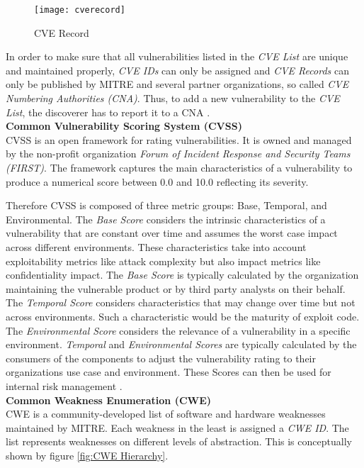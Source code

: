 \begin{figure}[H]
	\centering
	\texttt{[image: cverecord]}
	\caption[CVE Record]{CVE Record }
	\label{fig:CVE Record}
\end{figure}

In order to make sure that all vulnerabilities listed in the \textit{CVE List} are unique and maintained properly, \textit{CVE IDs} can only be assigned and \textit{CVE Records} can only be published by MITRE and several partner organizations, so called \textit{CVE Numbering Authorities (CNA)}. Thus, to add a new vulnerability to the \textit{CVE List}, the discoverer has to report it to a CNA \cite{CVEWebsite}.\\

\noindent
\textbf{Common Vulnerability Scoring System (CVSS)}\\
\noindent
CVSS is an open framework for rating vulnerabilities. It is owned and managed by the non-profit organization \textit{Forum of Incident Response and Security Teams (FIRST)}. The framework captures the main characteristics of a vulnerability to produce a numerical score between 0.0 and 10.0 reflecting its severity.\par
Therefore CVSS is composed of three metric groups: Base, Temporal, and Environmental. The \textit{Base Score} considers the intrinsic characteristics of a vulnerability that are constant over time and assumes the worst case impact across different environments. These characteristics take into account exploitability metrics like attack complexity but also impact metrics like confidentiality impact. The \textit{Base Score} is typically calculated by the organization maintaining the vulnerable product or by third party analysts on their behalf. The \textit{Temporal Score} considers characteristics that may change over time but not across environments. Such a characteristic would be the maturity of exploit code. The \textit{Environmental Score} considers the relevance of a vulnerability in a specific environment. \textit{Temporal} and \textit{Environmental Scores} are typically calculated by the consumers of the components to adjust the vulnerability rating to their organizations use case and environment. These Scores can then be used for internal risk management \cite{CVSSSpec}.\\

\noindent
\textbf{Common Weakness Enumeration (CWE)}\\
\noindent
CWE is a community-developed list of software and hardware weaknesses maintained by MITRE. Each weakness in the least is assigned a\textit{ CWE ID}. The list represents weaknesses on different levels of abstraction. This is conceptually shown by figure \ref{fig:CWE Hierarchy}.

